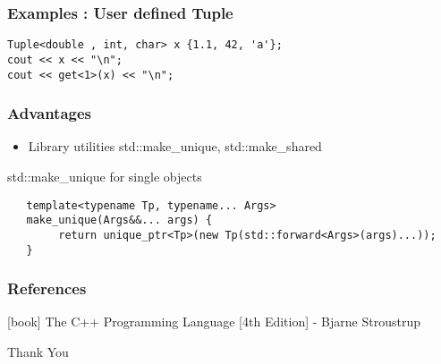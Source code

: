 \documentclass{beamer}
\begin{document}
\begin{frame}[fragile]
\frametitle{Examples : User defined Tuple }

\begin{lstlisting}
Tuple<double , int, char> x {1.1, 42, 'a'};
cout << x << "\n";
cout << get<1>(x) << "\n";
\end{lstlisting}

\end{frame}


\begin{frame}[fragile]
\frametitle{Advantages}

\begin{itemize}
\item Library utilities std::make\_unique, std::make\_shared
\end{itemize}

\begin{block}{std::make\_unique for single objects }
\begin{lstlisting}
   template<typename Tp, typename... Args>                             
   make_unique(Args&&... args) { 
        return unique_ptr<Tp>(new Tp(std::forward<Args>(args)...));
   }
\end{lstlisting}
\end{block}

\end{frame}




\begin{frame}
\frametitle{References}
\begin{thebibliography}{2} %
[book]
 The C++ Programming Language [4th Edition] - Bjarne Stroustrup
\end{thebibliography}
\end{frame}


\begin{frame}
\Huge{\centerline{Thank You}}
\end{frame}





\end{document}
